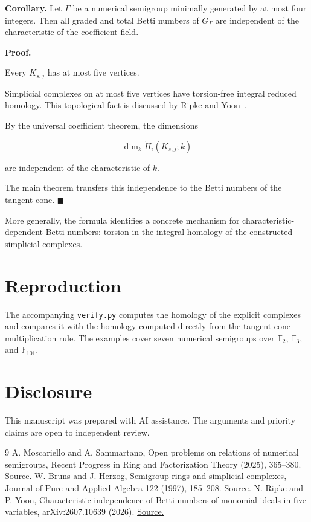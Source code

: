 \documentclass[11pt]{article}
\begin{document}
\textbf{Corollary.} Let \(\Gamma\) be a numerical semigroup minimally generated by at most four integers. Then all graded and total Betti numbers of \(G_\Gamma\) are independent of the characteristic of the coefficient field.

\textbf{Proof.}

Every \(K_{s,j}\) has at most five vertices.

Simplicial complexes on at most five vertices have torsion-free integral reduced homology. This topological fact is discussed by Ripke and Yoon~\cite{RY}.

By the universal coefficient theorem, the dimensions

\[
\dim_k\widetilde H_i(K_{s,j};k)
\]

are independent of the characteristic of \(k\).

The main theorem transfers this independence to the Betti numbers of the tangent cone. \(\blacksquare\)

More generally, the formula identifies a concrete mechanism for characteristic-dependent Betti numbers: torsion in the integral homology of the constructed simplicial complexes.

\section{Reproduction}
The accompanying \texttt{verify.py} computes the homology of the explicit complexes and compares it with the homology computed directly from the tangent-cone multiplication rule. The examples cover seven numerical semigroups over $\mathbb F_2$, $\mathbb F_3$, and $\mathbb F_{101}$.

\section*{Disclosure}
This manuscript was prepared with AI assistance. The arguments and priority claims are open to independent review.

\begin{thebibliography}{9}
 A. Moscariello and A. Sammartano, Open problems on relations of numerical semigroups, Recent Progress in Ring and Factorization Theory (2025), 365--380. \href{https://arxiv.org/html/2406.00790v3}{Source.}
 W. Bruns and J. Herzog, Semigroup rings and simplicial complexes, Journal of Pure and Applied Algebra 122 (1997), 185--208. \href{https://doi.org/10.1016/S0022-4049(97)00051-0}{Source.}
 N. Ripke and P. Yoon, Characteristic independence of Betti numbers of monomial ideals in five variables, arXiv:2607.10639 (2026). \href{https://arxiv.org/abs/2607.10639}{Source.}
\end{thebibliography}
\end{document}
